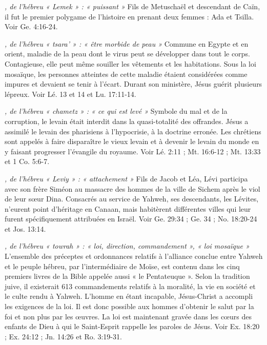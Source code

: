 \begin{multicols}{2}
\textit{, de l'hébreu « Lemek » : « puissant »}\newline
Fils de Metuschaël et descendant de Caïn, il fut le premier polygame de l'histoire en prenant deux femmes : Ada et Tsilla. Voir Ge. 4:16-24.

\textit{, de l'hébreu « tsara' » : « être morbide de peau »}\newline
Commune en Egypte et en orient, maladie de la peau dont le virus peut se développer dans tout le corps. Contagieuse, elle peut même souiller les vêtements et les habitations. Sous la loi mosaïque, les personnes atteintes de cette maladie étaient considérées comme impures et devaient se tenir à l'écart. Durant son ministère, Jésus guérit plusieurs lépreux. Voir Lé. 13 et 14 et Lu. 17:11-14.

\textit{, de l'hébreu « chametz » : « ce qui est levé »}\newline
Symbole du mal et de la corruption, le levain était interdit dans la quasi-totalité des offrandes. Jésus a assimilé le levain des pharisiens à l'hypocrisie, à la doctrine erronée. Les chrétiens sont appelés à faire disparaître le vieux levain et à devenir le levain du monde en y faisant progresser l'évangile du royaume. Voir Lé. 2:11 ; Mt. 16:6-12 ; Mt. 13:33 et 1 Co. 5:6-7.

\textit{, de l'hébreu « Leviy » : « attachement »}\newline
Fils de Jacob et Léa, Lévi participa avec son frère Siméon au massacre des hommes de la ville de Sichem après le viol de leur sœur Dina. Consacrés au service de Yahweh, ses descendants, les Lévites, n'eurent point d'héritage en Canaan, mais habitèrent différentes villes qui leur furent spécifiquement attribuées en Israël. Voir Ge. 29:34 ; Ge. 34 ; No. 18:20-24 et Jos. 13:14.

\textit{, de l'hébreu « towrah » : « loi, direction, commandement », « loi mosaïque »}\newline
L'ensemble des préceptes et ordonnances relatifs à l'alliance conclue entre Yahweh et le peuple hébreu, par l'intermédiaire de Moïse, est contenu dans les cinq premiers livres de la Bible appelée aussi « le Pentateuque ». Selon la tradition juive, il existerait 613 commandements relatifs à la moralité, la vie en société et le culte rendu à Yahweh. L'homme en étant incapable, Jésus-Christ a accompli les exigences de la loi. Il est donc possible aux hommes d'obtenir le salut par la foi et non plus par les œuvres. La loi est maintenant gravée dans les cœurs des enfants de Dieu à qui le Saint-Esprit rappelle les paroles de Jésus. Voir Ex. 18:20 ; Ex. 24:12 ; Jn. 14:26 et Ro. 3:19-31.


\end{multicols}
